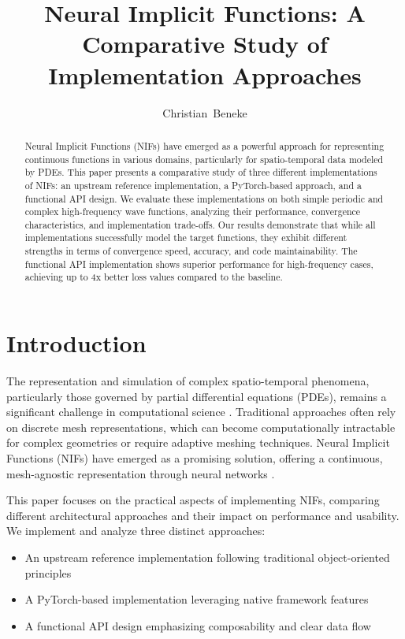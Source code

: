 \documentclass[10pt,journal,compsoc]{IEEEtran}
\begin{document}
\title{Neural Implicit Functions: A Comparative Study of Implementation Approaches}

\author{Christian~Beneke}

\maketitle

\begin{abstract}
Neural Implicit Functions (NIFs) have emerged as a powerful approach for representing continuous functions in various domains, particularly for spatio-temporal data modeled by PDEs. This paper presents a comparative study of three different implementations of NIFs: an upstream reference implementation, a PyTorch-based approach, and a functional API design. We evaluate these implementations on both simple periodic and complex high-frequency wave functions, analyzing their performance, convergence characteristics, and implementation trade-offs. Our results demonstrate that while all implementations successfully model the target functions, they exhibit different strengths in terms of convergence speed, accuracy, and code maintainability. The functional API implementation shows superior performance for high-frequency cases, achieving up to 4x better loss values compared to the baseline.
\end{abstract}

\section{Introduction}
The representation and simulation of complex spatio-temporal phenomena, particularly those governed by partial differential equations (PDEs), remains a significant challenge in computational science \cite{neural_fields2022}. Traditional approaches often rely on discrete mesh representations, which can become computationally intractable for complex geometries or require adaptive meshing techniques. Neural Implicit Functions (NIFs) have emerged as a promising solution, offering a continuous, mesh-agnostic representation through neural networks \cite{nif2023}.

This paper focuses on the practical aspects of implementing NIFs, comparing different architectural approaches and their impact on performance and usability. We implement and analyze three distinct approaches:
\begin{itemize}
    \item An upstream reference implementation following traditional object-oriented principles
    \item A PyTorch-based implementation leveraging native framework features
    \item A functional API design emphasizing composability and clear data flow
\end{itemize}
\end{document}
